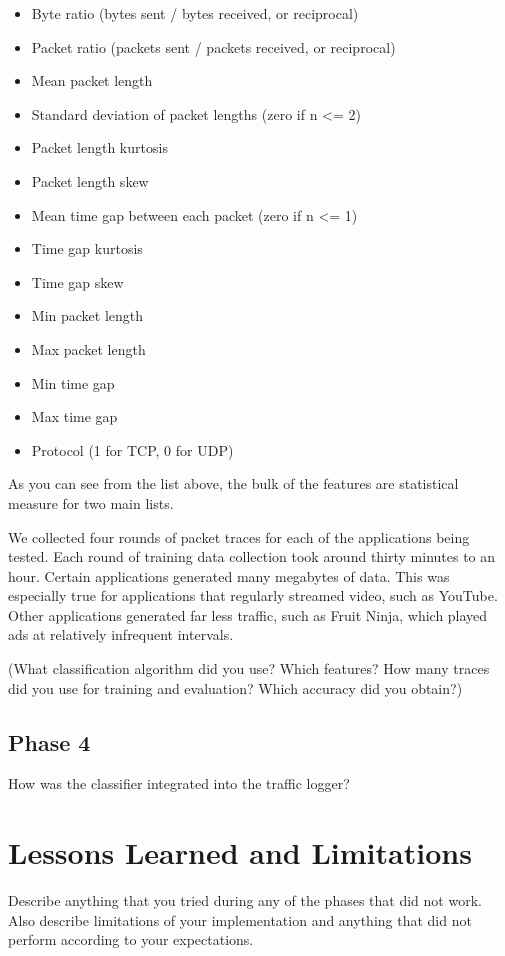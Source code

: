 \documentclass[a4paper, 11pt]{article} %
\begin{document}
\begin{itemize}
    \item Byte ratio (bytes sent / bytes received, or reciprocal)
    \item Packet ratio (packets sent / packets received, or reciprocal)
    \item Mean packet length
    \item Standard deviation of packet lengths (zero if n <= 2)
    \item Packet length kurtosis
    \item Packet length skew
    \item Mean time gap between each packet (zero if n <= 1)
    \item Time gap kurtosis
    \item Time gap skew
    \item Min packet length
    \item Max packet length
    \item Min time gap
    \item Max time gap
    \item Protocol (1 for TCP, 0 for UDP)
\end{itemize}

As you can see from the list above, the bulk of the features are statistical measure
for two main lists.

We collected four rounds of packet traces for each of the applications being tested.
Each round of training data collection took around thirty minutes to an hour. Certain
applications generated many megabytes of data. This was especially true for applications
that regularly streamed video, such as YouTube. Other applications generated far less
traffic, such as Fruit Ninja, which played ads at relatively infrequent intervals.


(What classification algorithm did you use? Which features? How many traces did
you use for training and evaluation? Which accuracy did you obtain?)

\subsection{Phase 4}

How was the classifier integrated into the traffic logger?

\lipsum

\section{Lessons Learned and Limitations}

Describe anything that you tried during any of the phases that did not work.
Also describe limitations of your implementation and anything that did not
perform according to your expectations.

\newpage

\printbibliography
\end{document}
